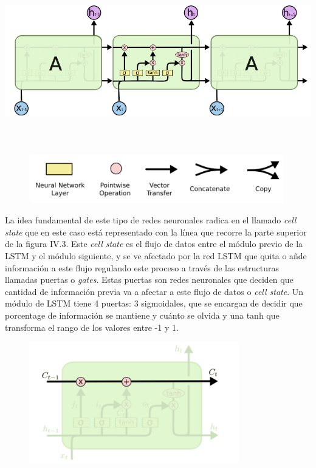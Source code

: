\documentclass[]{DissertateUSU}
\begin{document}
\includegraphics[width=6.25in,height=3.125in]{lstm1.png}
\includegraphics[width=5.20833in,height=0.83333in]{lstmlegend.png}
\centering
{}

\setlength\parskip{5ex}
\justifying

\noindent La idea fundamental de este tipo de redes neuronales radica en
el llamado \emph{cell state} que en este caso está representado con la
línea que recorre la parte superior de la figura IV.3. Este \emph{cell
state} es el flujo de datos entre el módulo previo de la LSTM y el
módulo siguiente, y se ve afectado por la red LSTM que quita o añde
información a este flujo regulando este proceso a través de las
estructuras llamadas puertas o \emph{gates}. Estas puertas son redes
neuronales que deciden que cantidad de información previa va a afectar a
este flujo de datos o \emph{cell state}. Un módulo de LSTM tiene 4
puertas: 3 sigmoidales, que se encargan de decidir que porcentage de
información se mantiene y cuánto se olvida y una tanh que transforma el
rango de los valores entre -1 y 1.

\includegraphics[width=4.42708in,height=2.08333in]{cellstate.png}
\centering
{}
\end{document}
